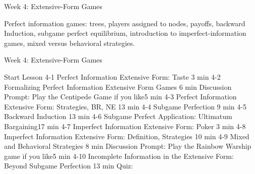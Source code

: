 Week 4: Extensive-Form Games

Perfect information games: trees, players assigned to nodes, payoffs, backward Induction, subgame perfect equilibrium, introduction to imperfect-information games, mixed versus behavioral strategies.

Week 4: Extensive-Form Games

Start Lesson
4-1 Perfect Information Extensive Form: Taste 3 min
4-2 Formalizing Perfect Information Extensive Form Games 6 min
Discussion Prompt:
Play the Centipede Game if you like5 min
4-3 Perfect Information Extensive Form: Strategies, BR, NE 13 min
4-4 Subgame Perfection 9 min
4-5 Backward Induction 13 min
4-6 Subgame Perfect Application: Ultimatum Bargaining17 min
4-7 Imperfect Information Extensive Form: Poker 3 min
4-8 Imperfect Information Extensive Form: Definition, Strategies 10 min
4-9 Mixed and Behavioral Strategies 8 min
Discussion Prompt:
Play the Rainbow Warship game if you like5 min
4-10 Incomplete Information in the Extensive Form: Beyond Subgame Perfection 13 min
Quiz:
